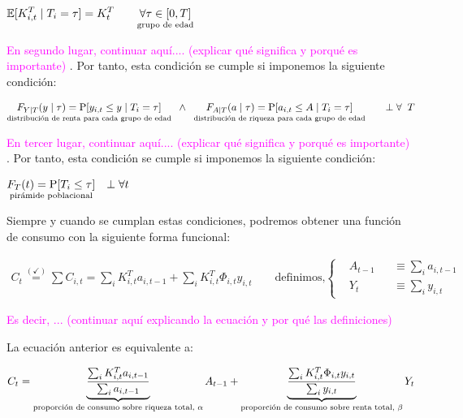 \documentclass[10pt,a4paper]{article}
\begin{document}
$\begin{aligned}
  \mathbb E[K_{i,t}^T\;|\;T_i=\tau]=K_{t}^T\quad &&\underset{\text{\scriptsize grupo de edad}}{\forall\tau\in[0,T]}
\end{aligned}$

\textcolor{magenta}{En segundo lugar, continuar aquí.... (explicar qué significa y porqué es importante)} . Por tanto, esta condición se cumple si imponemos la siguiente condición:

$\begin{aligned}
  \underset{\text{\scriptsize distribución de renta para cada grupo de edad}}{F_{Y|T}(y\;|\;\tau)=\mathrm P[y_{i,t}\leq y\;|\;T_i=\tau]}\;\;\wedge\;\; \underset{\text{\scriptsize distribución de riqueza para cada grupo de edad}}{F_{A|T}(a\;|\;\tau)=\mathrm P[a_{i,t}\leq A\;|\;T_i=\tau]}\quad &&\perp\forall \;\;T
\end{aligned}$


\textcolor{magenta}{En tercer lugar, continuar aquí.... (explicar qué significa y porqué es importante)} . Por tanto, esta condición se cumple si imponemos la siguiente condición:

$\begin{aligned}
  \underset{\text{\scriptsize pirámide poblacional}}{F_T(t)=\mathrm P[T_i\leq \tau]}&&\perp \forall t
\end{aligned}$

Siempre y cuando se cumplan estas condiciones, podremos obtener una función de consumo con la siguiente forma funcional:

$\begin{aligned}
  C_t\overset{(\checkmark)}{=}\sum C_{i,t}=\sum_iK_{i,t}^Ta_{i,t-1}+\sum_{i}K_{i,t}^T\Phi_{i,t}y_{i,t}\qquad \text{definimos,}
    \left\{\begin{aligned}
        &A_{t-1}&&\equiv\sum_ia_{i,t-1}\\
        &Y_t&&\equiv \sum_iy_{i,t}
    \end{aligned}\right.
\end{aligned}$

\textcolor{magenta}{Es decir, ... (continuar aquí explicando la ecuación y por qué las definiciones)}

La ecuación anterior es equivalente a:

$\begin{aligned}
  C_t=\underbrace{\frac{\sum_iK_{i,t}^Ta_{i,t-1}}{\sum_ia_{i,t-1}}}_{\text{\scriptsize proporción de consumo sobre riqueza total, $\alpha$}}A_{t-1}+\underbrace{\frac{\sum_iK_{i,t}^T\Phi_{i,t}y_{i,t}}{\sum_iy_{i,t}}}_{\text{\scriptsize proporción de consumo sobre renta total, $\beta$}}Y_{t}
\end{aligned}$
\end{document}
